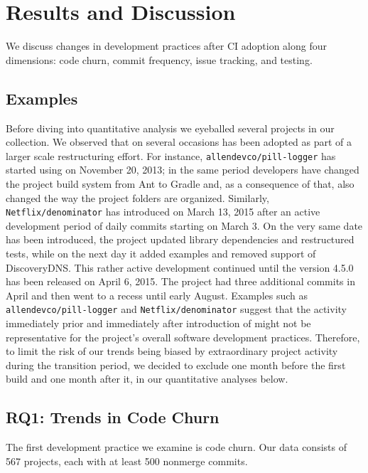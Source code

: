 
\section{Results and Discussion}

We discuss changes in development practices after CI adoption along four 
dimensions: code churn, commit frequency, issue tracking, and testing. 

\subsection{Examples}
\label{sec:examples}

Before diving into quantitative analysis we eyeballed several projects in our 
collection. 
We observed that on several occasions \Tvis has been adopted as part of a 
larger scale restructuring effort. 
For instance, \texttt{allendevco/pill-logger} has started using \Tvis on November 
20, 2013; in the same period developers have changed the project build system 
from Ant to Gradle and, as a consequence of that, also changed the way the 
project folders are organized.
Similarly, \texttt{Netflix/denominator} has introduced \Tvis on March 13, 2015
after an active development period of daily commits starting on March 3.
On the very same date \Tvis has been introduced, the project updated library 
dependencies and restructured tests, while on the next day it added examples 
and removed support of DiscoveryDNS.
This rather active development continued until the version 4.5.0 has been 
released on April 6, 2015.
The project had three additional commits in April and then went to a recess 
until early August. 
Examples such as \texttt{allendevco/pill-logger} and \texttt{Netflix/denominator} 
suggest that the activity immediately prior and immediately after introduction 
of \Tvis might not be representative for the project's overall software development
practices.
Therefore, to limit the risk of our trends being biased by extraordinary project 
activity during the transition period, we decided to exclude one month before 
the first \Tvis build and one month after it, in our quantitative analyses below.

\subsection{RQ1: Trends in Code Churn}

The first development practice we examine is code churn.
Our data consists of 567 projects, each with at least 500 nonmerge commits.

